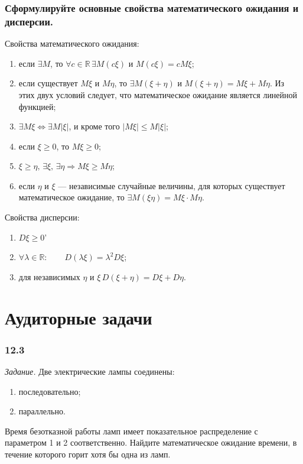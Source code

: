 \subsubsection*{Сформулируйте основные свойства математического ожидания и дисперсии.}

Свойства математического ожидания:
\begin{enumerate}
\item если $ \exists M$, то $ \forall c \in \mathbb{R} \, \exists M \left( c \xi \right) $ и $ M \left( c \xi \right) = cM \xi $;
\item если существует $M \xi $ и $M \eta $, то $ \exists M \left( \xi + \eta \right) $ и $M \left( \xi + \eta \right) = M \xi + M \eta $.
Из этих двух условий следует, что математическое ожидание является линейной функцией;
\item $ \exists M \xi \iff \exists M \left| \xi \right| $, и кроме того $ \left| M \xi \right| \leq M \left| \xi \right| $;
\item если $ \xi \geq 0$, то $M \xi \geq 0$;
\item $\xi \geq \eta, \, \exists \xi, \, \exists \eta \Rightarrow M \xi \geq M \eta $;
\item если $ \eta $ и $ \xi $ --- независимые случайные величины,
для которых существует математическое ожидание, то $ \exists M \left( \xi \eta \right) = M \xi \cdot M \eta $.
\end{enumerate}

Свойства дисперсии:
\begin{enumerate}
\item $D \xi \geq 0$'
\item $ \forall \lambda \in \mathbb{R}: \qquad D \left( \lambda \xi \right) = \lambda^2 D \xi $;
\item для независимых $ \eta $ и $ \xi \, D \left( \xi + \eta \right) = D \xi + D \eta $.
\end{enumerate}

\section*{Аудиторные задачи}

\subsubsection*{12.3}

\textit{Задание.} Две электрические лампы соединены:
\begin{enumerate}[label=\alph*)]
\item последовательно;
\item параллельно.
\end{enumerate}
Время безотказной работы ламп имеет показательное распределение с параметром 1 и 2 соответственно.
Найдите математическое ожидание времени, в течение которого горит хотя бы одна из ламп.

